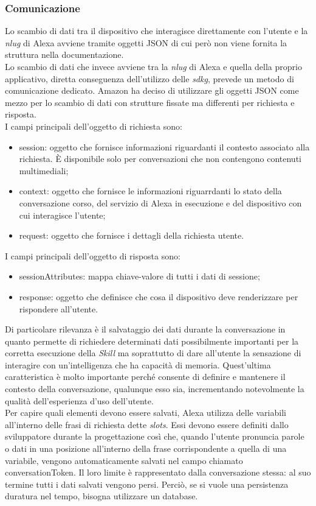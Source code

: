 		\subsubsection{Comunicazione}
		Lo scambio di dati tra il dispositivo che interagisce direttamente con l'utente e la \emph{\gls{nlug}} di Alexa avviene tramite oggetti JSON di cui però non viene fornita la struttura nella documentazione. \\
		Lo scambio di dati che invece avviene tra la \emph{\gls{nlug}} di Alexa e quella della proprio applicativo, diretta conseguenza dell'utilizzo delle \emph{\gls{sdkg}}, prevede un metodo di comunicazione dedicato. Amazon ha deciso di utilizzare gli oggetti JSON come mezzo per lo scambio di dati con strutture fissate ma differenti per richiesta e risposta. \\
		I campi principali dell'oggetto di richiesta sono:
		\begin{itemize}
			\item session: oggetto che fornisce informazioni riguardanti il contesto associato alla richiesta. È disponibile solo per conversazioni che non contengono contenuti multimediali;
			\item context: oggetto che fornisce le informazioni riguarrdanti lo stato della conversazione corso, del servizio di Alexa in esecuzione e del dispositivo con cui interagisce l'utente;
			\item request: oggetto che fornisce i dettagli della richiesta utente.
		\end{itemize}
		I campi principali dell'oggetto di risposta sono:
		\begin{itemize}
			\item sessionAttributes: mappa chiave-valore di tutti i dati di sessione;
			\item response: oggetto che definisce che cosa il dispositivo deve renderizzare per rispondere all'utente.
		\end{itemize}
		Di particolare rilevanza è il salvataggio dei dati durante la conversazione in quanto permette di richiedere determinati dati possibilmente importanti per la corretta esecuzione della \emph{Skill} ma soprattutto di dare all'utente la sensazione di interagire con un'intelligenza che ha capacità di memoria. Quest'ultima caratteristica è molto importante perché consente di definire e mantenere il contesto della conversazione, qualunque esso sia, incrementando notevolmente la qualità dell'esperienza d'uso dell'utente. \\
		Per capire quali elementi devono essere salvati, Alexa utilizza delle variabili all'interno delle frasi di richiesta dette \emph{slots}. Essi devono essere definiti dallo sviluppatore durante la progettazione così che, quando l'utente pronuncia parole o dati in una posizione all'interno della frase corrispondente a quella di una variabile, vengono automaticamente salvati nel campo chiamato conversationToken. Il loro limite è rappresentato dalla conversazione stessa: al suo termine tutti i dati salvati vengono persi. Perciò, se si vuole una persistenza duratura nel tempo, bisogna utilizzare un database.
